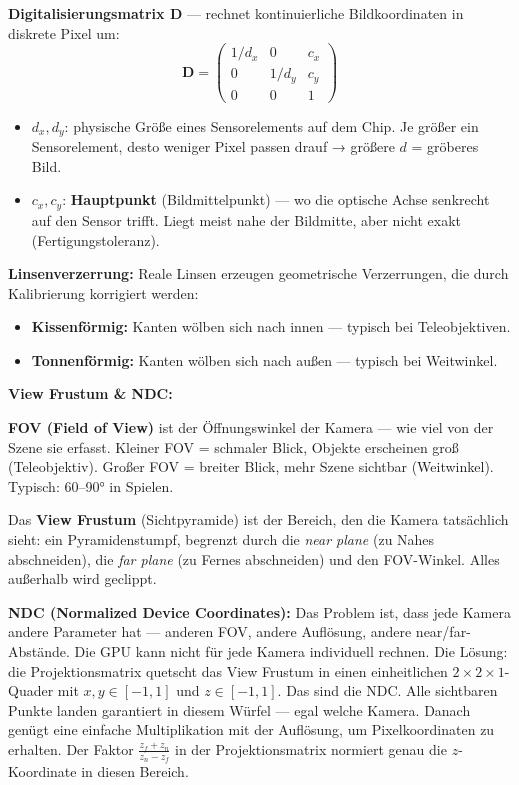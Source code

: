 \documentclass[12pt, a4paper]{article}
\begin{document}
\textbf{Digitalisierungsmatrix D} — rechnet kontinuierliche Bildkoordinaten in diskrete Pixel um:
\[
  \mathbf{D} = \begin{pmatrix}1/d_x&0&c_x\\0&1/d_y&c_y\\0&0&1\end{pmatrix}
\]
\begin{itemize}
  \item $d_x, d_y$: physische Größe eines Sensorelements auf dem Chip. Je größer ein Sensorelement, desto weniger Pixel passen drauf → größere $d$ = gröberes Bild.
  \item $c_x, c_y$: \textbf{Hauptpunkt} (Bildmittelpunkt) — wo die optische Achse senkrecht auf den Sensor trifft. Liegt meist nahe der Bildmitte, aber nicht exakt (Fertigungstoleranz).
\end{itemize}

\textbf{Linsenverzerrung:} Reale Linsen erzeugen geometrische Verzerrungen, die durch Kalibrierung korrigiert werden:
\begin{itemize}
  \item \textbf{Kissenförmig:} Kanten wölben sich nach innen — typisch bei Teleobjektiven.
  \item \textbf{Tonnenförmig:} Kanten wölben sich nach außen — typisch bei Weitwinkel.
\end{itemize}

\textbf{View Frustum \& NDC:}

\textbf{FOV (Field of View)} ist der Öffnungswinkel der Kamera — wie viel von der Szene sie erfasst. Kleiner FOV = schmaler Blick, Objekte erscheinen groß (Teleobjektiv). Großer FOV = breiter Blick, mehr Szene sichtbar (Weitwinkel). Typisch: 60–90° in Spielen.

Das \textbf{View Frustum} (Sichtpyramide) ist der Bereich, den die Kamera tatsächlich sieht: ein Pyramidenstumpf, begrenzt durch die \textit{near plane} (zu Nahes abschneiden), die \textit{far plane} (zu Fernes abschneiden) und den FOV-Winkel. Alles außerhalb wird geclippt.

\textbf{NDC (Normalized Device Coordinates):} Das Problem ist, dass jede Kamera andere Parameter hat — anderen FOV, andere Auflösung, andere near/far-Abstände. Die GPU kann nicht für jede Kamera individuell rechnen. Die Lösung: die Projektionsmatrix quetscht das View Frustum in einen einheitlichen $2\times2\times1$-Quader mit $x,y \in [-1,1]$ und $z \in [-1,1]$. Das sind die NDC. Alle sichtbaren Punkte landen garantiert in diesem Würfel — egal welche Kamera. Danach genügt eine einfache Multiplikation mit der Auflösung, um Pixelkoordinaten zu erhalten. Der Faktor $\frac{z_f+z_n}{z_n-z_f}$ in der Projektionsmatrix normiert genau die $z$-Koordinate in diesen Bereich.
\end{document}
